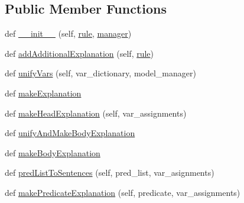 \subsection*{Public Member Functions}
\begin{DoxyCompactItemize}
\item 
def \hyperlink{classbackup__explanation__extractor_1_1_explanation_template_a2af2c7e8746cada01b2224b1dd801d51}{\+\_\+\+\_\+init\+\_\+\+\_\+} (self, \hyperlink{classbackup__explanation__extractor_1_1_explanation_template_a2af6ecb7ac9890bc38f063369c1dd966}{rule}, \hyperlink{classbackup__explanation__extractor_1_1_explanation_template_a210493351b1a5da793855d40db5495d1}{manager})
\item 
def \hyperlink{classbackup__explanation__extractor_1_1_explanation_template_a6810c242d5bcbefefb898c54cb753834}{add\+Additional\+Explanation} (self, \hyperlink{classbackup__explanation__extractor_1_1_explanation_template_a2af6ecb7ac9890bc38f063369c1dd966}{rule})
\item 
def \hyperlink{classbackup__explanation__extractor_1_1_explanation_template_a9f57fbe9338950fdf8430a4965aa9957}{unify\+Vars} (self, var\+\_\+dictionary, model\+\_\+manager)
\item 
def \hyperlink{classbackup__explanation__extractor_1_1_explanation_template_af8d3f520250ab3d123ac2d41cd3a31d8}{make\+Explanation}
\item 
def \hyperlink{classbackup__explanation__extractor_1_1_explanation_template_a000b5dde5d3283d3bb8ff67f5dc3b196}{make\+Head\+Explanation} (self, var\+\_\+assignments)
\item 
def \hyperlink{classbackup__explanation__extractor_1_1_explanation_template_af334342a124e95d4bfc71f8a9dd280fa}{unify\+And\+Make\+Body\+Explanation}
\item 
def \hyperlink{classbackup__explanation__extractor_1_1_explanation_template_a74bb8f8495acbb8e4289c38bb186713b}{make\+Body\+Explanation}
\item 
def \hyperlink{classbackup__explanation__extractor_1_1_explanation_template_a9a69a548709d5f6d4d19a9e21b5f3e36}{pred\+List\+To\+Sentences} (self, pred\+\_\+list, var\+\_\+asignments)
\item 
def \hyperlink{classbackup__explanation__extractor_1_1_explanation_template_a29410d042101cae9fcbfb96793399e00}{make\+Predicate\+Explanation} (self, predicate, var\+\_\+assignments)
\end{DoxyCompactItemize}
